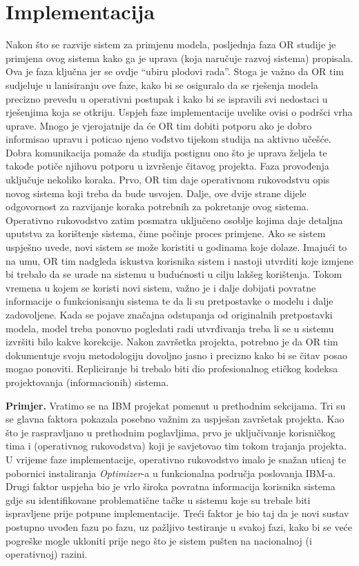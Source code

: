 \documentclass[a4paper, utf8, 11pt, colorlinks]{book}
\begin{document}
\section{Implementacija}
Nakon što se razvije sistem za primjenu modela, posljednja faza OR studije je primjena ovog sistema kako ga je uprava (koja naručuje razvoj sistema) propisala. Ova je faza ključna jer se ovdje ``ubiru plodovi rada''. Stoga je važno da OR tim  sudjeluje u  lanisiranju ove faze, kako bi se osiguralo da se rješenja modela precizno prevedu u operativni postupak i kako bi se ispravili svi nedostaci u rješenjima koja se otkriju. Uspjeh faze implementacije uvelike ovisi o podršci vrha uprave. Mnogo je vjerojatnije da će OR tim dobiti potporu ako je dobro informisao upravu i poticao  njeno vođstvo tijekom studija na aktivno učešće. Dobra komunikacija pomaže da studija postignu ono što je uprava željela te takođe potiče njihovu potporu u izvršenje čitavog projekta.  Faza provođenja uključuje nekoliko koraka. Prvo, OR tim daje operativnom rukovodstvu opis novog sistema koji treba da bude usvojen. Dalje, ove dvije strane dijele odgovornost za razvijanje koraka potrebnih za pokretanje ovog sistema. Operativno rukovodstvo zatim posmatra uključeno osoblje kojima daje detaljna uputstva za korištenje sistema, čime počinje proces primjene. Ako se sistem uspješno uvede, novi sistem se može koristiti u godinama koje dolaze. Imajući to na umu, OR tim nadgleda iskustva korisnika sistem i nastoji utvrditi koje izmjene bi trebalo da se urade na sistemu u budućnosti u cilju lakšeg korištenja.  Tokom vremena u kojem se koristi novi sistem, važno je i dalje dobijati povratne informacije o funkcionisanju sistema te da li su pretpostavke o modelu i dalje zadovoljene. Kada se pojave značajna odstupanja od originalnih pretpostavki modela, model treba ponovno pogledati radi utvrđivanja treba li se u sistemu izvršiti bilo kakve korekcije. Nakon završetka projekta, potrebno je da OR tim dokumentuje svoju metodologiju dovoljno jasno i precizno kako bi se čitav posao mogao ponoviti. Repliciranje bi trebalo
biti dio profesionalnog etičkog kodeksa projektovanja (informacionih) sistema. %

\textbf{Primjer.} Vratimo se na   IBM projekat pomenut u prethodnim sekcijama.  Tri su se glavna faktora pokazala posebno važnim za uspješan završetak projekta. Kao što je raspravljano u prethodnim poglavljima, 
prvo je   uključivanje korisničkog tima i (operativnog rukovodstva) koji je savjetovao tim tokom trajanja   projekta. U vrijeme faze implementacije, operativno rukovodstvo imalo je snažan  uticaj te pobornici instaliranja \emph{Optimizer}-a u  funkcionalna područja poslovanja IBM-a. Drugi faktor uspjeha bio je vrlo široka povratna informacija korisnika sistema gdje su identifikovane problematične tačke u sistemu koje su  trebale biti ispravljene prije potpune implementacije. 
Treći faktor je bio taj da je novi sustav postupno uvođen fazu po fazu, uz pažljivo testiranje u svakoj fazi, kako bi se veće pogreške mogle ukloniti prije nego što je sistem   pušten na  nacionalnoj (i operativnoj) razini.  
\vspace{0.5cm}
\end{document}
